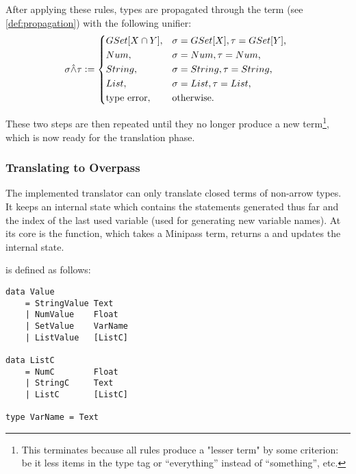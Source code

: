 \documentclass[main.tex]{subfiles}
\begin{document}
After applying these rules, types are propagated through the term
(see \cref{def:propagation}) with the following unifier:
\[
    \sigma \unify \tau \defeq
    \begin{cases*}
        GSet[X \cap Y] ,& $\sigma = GSet[X], \tau = GSet[Y]$, \\
        Num ,& $\sigma = Num, \tau = Num$, \\
        String ,& $\sigma = String, \tau = String$, \\
        List ,& $\sigma = List, \tau = List$, \\
        \text{type error} ,& otherwise. \\
    \end{cases*}
\]

These two steps are then repeated until they no longer produce a new term\footnote{
    This terminates because all rules produce a "lesser term" by some criterion:
    be it less items in the type tag or ``everything'' instead of ``something'', etc.
}, which is now ready for the translation phase.


\subsubsection{Translating to Overpass}\label{sec:translation}
The implemented translator can only translate closed terms of non-arrow types.
It keeps an internal state which contains the statements generated thus far
and the index of the last used variable (used for generating new variable
names).
At its core is the  function, which takes a Minipass term,
returns a  and updates the internal state.

 is defined as follows:
\begin{lstwrap}\begin{lstlisting}
data Value
    = StringValue Text
    | NumValue    Float
    | SetValue    VarName
    | ListValue   [ListC]

data ListC
    = NumC        Float
    | StringC     Text
    | ListC       [ListC]

type VarName = Text
\end{lstlisting}\end{lstwrap}
\end{document}
